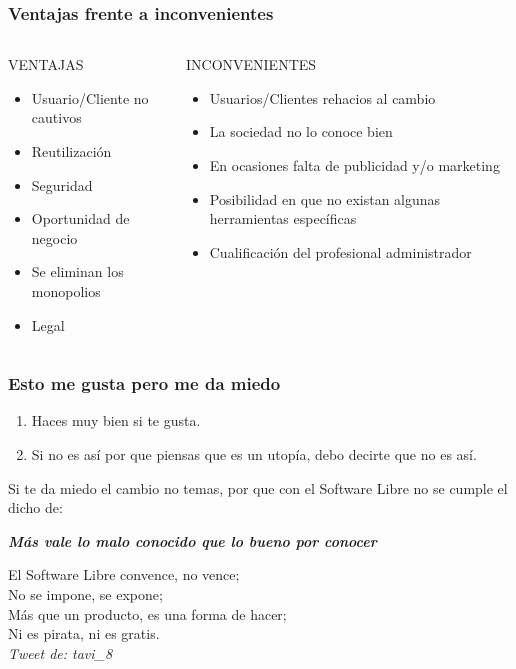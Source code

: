 \documentclass{beamer}
\begin{document}
		\begin{frame}
			\frametitle{Ventajas frente a inconvenientes}
			\begin{columns}
				\begin{column}[l]{5cm}
					\begin{center}
						VENTAJAS
					\end{center}
					\begin{itemize}
						\item<2-> Usuario/Cliente no cautivos
						\item<3-> Reutilización
						\item<4-> Seguridad
						\item<5-> Oportunidad de negocio
						\item<6-> Se eliminan los monopolios
						\item<7-> Legal
					\end{itemize}
				\end{column}
				\begin{column}[r]{5cm}
					\begin{center}
						INCONVENIENTES
					\end{center}
					\begin{itemize}
						\item<2-> Usuarios/Clientes rehacios al cambio
						\item<3-> La sociedad no lo conoce bien
						\item<4-> En ocasiones falta de publicidad y/o marketing
						\item<5-> Posibilidad en que no existan algunas herramientas específicas
						\item<6-> Cualificación del profesional administrador
					\end{itemize}
				\end{column}
			\end{columns}
		\end{frame}
		\begin{frame}
			\frametitle{Esto me gusta pero me da miedo}
			\begin{enumerate}
				\item Haces muy bien si te gusta.
				\item Si no es así por que piensas que es un utopía, debo decirte que no es así.
			\end{enumerate}
			Si te da miedo el cambio no temas, por que con el Software Libre no se cumple el dicho de:\\
			\begin{center}
				\textbf{\emph{Más vale lo malo conocido que lo bueno por conocer}}
			\end{center}
			\pause
			El Software Libre convence, no vence;\\
			\pause
			No se impone, se expone;\\
			\pause
			Más que un producto, es una forma de hacer;\\
			\pause
			Ni es pirata, ni es gratis.\\
			\textit{Tweet de: \@ tavi\_8}
		\end{frame}
\end{document}
